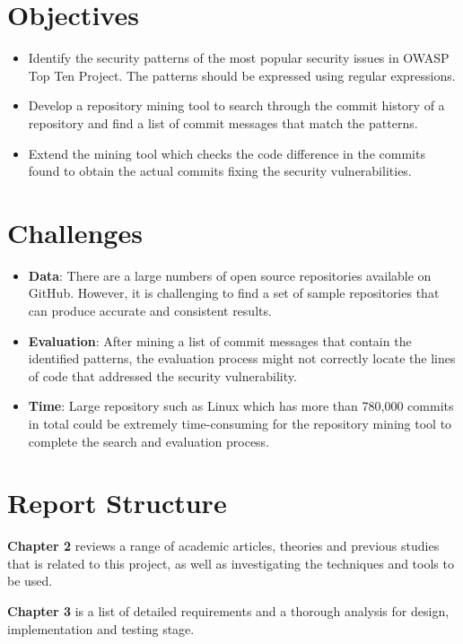 \documentclass[12pt, a4paper]{report}
\begin{document}
\section{Objectives}
\label{sec:objectives}
\begin{itemize}
	\item Identify the security patterns of the most popular security issues in OWASP Top Ten Project.
	The patterns should be expressed using regular expressions.
	\item Develop a repository mining tool to search through the commit history of a repository and
	find a list of commit messages that match the patterns.
	\item Extend the mining tool which checks the code difference in the commits found to obtain the
	actual commits fixing the security vulnerabilities.
\end{itemize}

\section{Challenges}
\begin{itemize}
	\item \textbf{Data}: There are a large numbers of open source repositories available on GitHub.
	However, it is challenging to find a set of sample repositories that can produce accurate and
	consistent results.
	\item \textbf{Evaluation}: After mining a list of commit messages that contain the identified
	patterns, the evaluation process might not correctly locate the lines of code that addressed the
	security vulnerability.
	\item \textbf{Time}: Large repository such as Linux which has more than 780,000 commits in total
	\cite{linux_repo} could be extremely time-consuming for the repository mining tool to complete the
	search and evaluation process.
\end{itemize}

\section{Report Structure}
\textbf{Chapter 2} reviews a range of academic articles, theories and previous studies that
is related to this project, as well as investigating the techniques and tools to be used.

\noindent\textbf{Chapter 3} is a list of detailed requirements and a thorough analysis for design,
implementation and testing stage.
\end{document}
